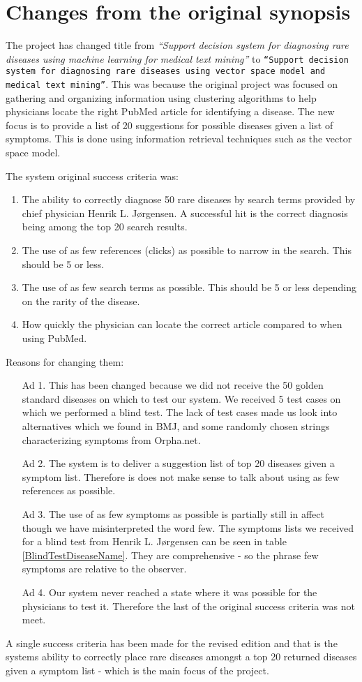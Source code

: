 \chapter*{Changes from the original synopsis}

The project has changed title from \textit{``Support decision system
  for diagnosing rare diseases using machine learning for medical text
  mining''} to \texttt{``Support decision system for diagnosing rare
  diseases using vector space model and \\ medical text
  mining''}. This was because the original project was focused on
gathering and organizing information using clustering algorithms to
help physicians locate the right PubMed article for identifying a
disease. The new focus is to provide a list of 20 suggestions for
possible diseases given a list of symptoms. This is done using
information retrieval techniques such as the vector space model.

The system original success criteria was:
\begin{enumerate}
\item The ability to correctly diagnose 50 rare diseases by search
  terms provided by chief physician Henrik L. J\o rgensen. A
  successful hit is the correct diagnosis being among the top 20
  search results.
\item The use of as few references (clicks) as possible to narrow in
  the search.  This should be 5 or less.
\item The use of as few search terms as possible. This should be 5 or
  less depending on the rarity of the disease.
\item How quickly the physician can locate the correct article
  compared to when using PubMed.
\end{enumerate}

Reasons for changing them:
\begin{itemize}
\item[Ad 1.] This has been changed because we did not receive the 50 golden
standard diseases on which to test our system. We received 5 test
cases on which we performed a blind test. The lack of test cases made
us look into alternatives which we found in BMJ, and some randomly
chosen strings characterizing symptoms from Orpha.net.

\item[Ad 2.] The system is to deliver a suggestion list of top 20 diseases given a
symptom list. Therefore is does not make sense to talk about using as
few references as possible.

\item[Ad 3.] The use of as few symptoms as possible is partially still in affect
though we have misinterpreted the word few. The symptoms lists we
received for a blind test from Henrik L. J\o rgensen can be seen in
table \ref{BlindTestDiseaseName}. They are comprehensive - so the
phrase few symptoms are relative to the observer.

\item[Ad 4.] Our system never reached a state where it was possible for the
physicians to test it. Therefore the last of the original success
criteria was not meet.
\end{itemize}

A single success criteria has been made for the revised
edition and that is the systems ability to correctly place rare
diseases amongst a top 20 returned diseases given a symptom list - 
which is the main focus of the project.
